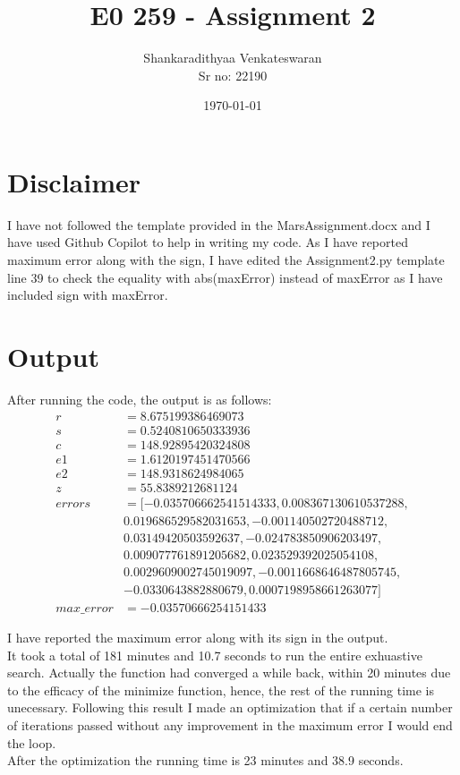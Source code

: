 \documentclass[12pt]{article}
\title{E0 259 - Assignment 2}
\author{Shankaradithyaa Venkateswaran\\ Sr no: 22190}
\date{\today}
\begin{document}
\begin{titlepage}
    \maketitle
\end{titlepage}

\section*{Disclaimer}
I have not followed the template provided in the MarsAssignment.docx and I have used Github Copilot to help in writing my code. As I have reported maximum error along with the sign, I have edited the Assignment2.py template line 39 to check the equality with abs(maxError) instead of maxError as I have included sign with maxError. 
\section*{Output}
After running the code, the output is as follows:
\begin{align*}
r &= 8.675199386469073\\
s &= 0.5240810650333936\\
c &= 148.92895420324808\\
e1 &= 1.6120197451470566\\
e2 &= 148.9318624984065\\
z &= 55.8389212681124\\
errors &= [-0.035706662541514333, 0.008367130610537288,\\ &0.019686529582031653, -0.001140502720488712,\\ &0.03149420503592637, -0.024783850906203497,\\ &0.009077761891205682, 0.023529392025054108,\\ &0.0029609002745019097, -0.0011668646487805745,\\ &-0.0330643882880679, 0.0007198958661263077]\\
max\_error &= -0.03570666254151433
\end{align*}

I have reported the maximum error along with its sign in the output.\\
It took a total of 181 minutes and 10.7 seconds to run the entire exhuastive search. Actually the function had converged a while back, within 20 minutes due to the efficacy of the minimize function, hence, the rest of the running time is unecessary. Following this result I made an optimization that if a certain number of iterations passed without any improvement in the maximum error I would end the loop.\\
After the optimization the running time is 23 minutes and 38.9 seconds.\\
\end{document}
